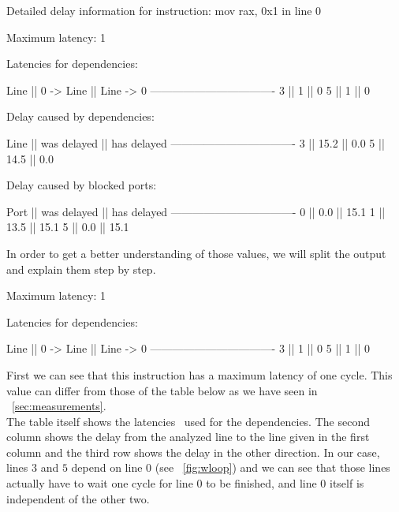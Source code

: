 \begin{Example}
Detailed delay information for instruction: mov rax, 0x1 in line 0

                Maximum latency: 1
                
                Latencies for dependencies:
                
                Line || 0 -> Line || Line -> 0
                ----------------------------------
                 3   ||     1     ||     0
                 5   ||     1     ||     0
                
                
                Delay caused by dependencies:
                
                Line || was delayed || has delayed
                ----------------------------------
                 3   ||    15.2     ||     0.0
                 5   ||    14.5     ||     0.0
                
                
                Delay caused by blocked ports:
                
                Port || was delayed || has delayed
                ----------------------------------
                 0   ||     0.0     ||    15.1
                 1   ||    13.5     ||    15.1
                 5   ||     0.0     ||    15.1
\end{Example}

In order to get a better understanding of those values, we will split the output and explain them step by step.

\begin{Example}
Maximum latency: 1

Latencies for dependencies:

Line || 0 -> Line || Line -> 0
----------------------------------
 3   ||     1     ||     0
 5   ||     1     ||     0
\end{Example}

First we can see that this instruction has a maximum latency of one cycle. This value can differ from those of the table below as we have seen in ~\autoref{sec:measurements}.\\
The table itself shows the latencies \suaca\ used for the dependencies. The second column shows the delay from the analyzed line to the line given in the first column and the third row shows the delay in the other direction. In our case, lines $3$ and $5$ depend on line $0$ (see ~\autoref{fig:wloop}) and we can see that those lines actually have to wait one cycle for line $0$ to be finished, and line $0$ itself is independent of the other two.\\

